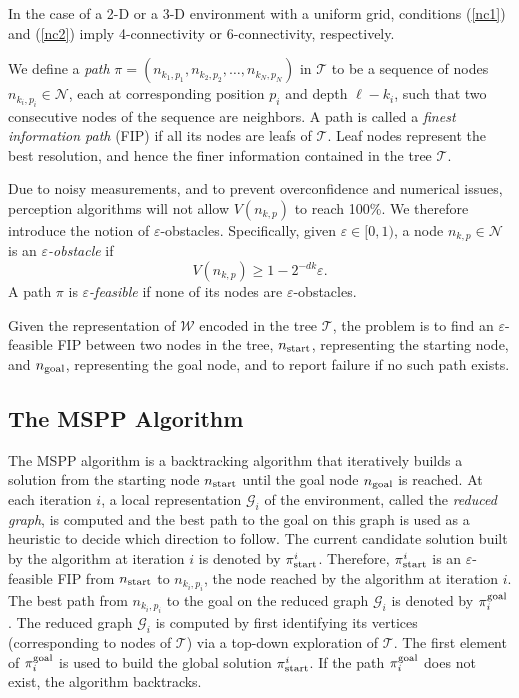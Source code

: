 \documentclass[letterpaper, 10 pt, conference]{ieeeconf}
\theoremstyle{definition}
\begin{document}
In the case of a 2-D or a 3-D environment with a uniform grid, conditions (\ref{nc1}) and (\ref{nc2}) imply 4-connectivity or 6-connectivity, respectively.

We define a \textit{path} $\pi=(n_{k_1,p_1},n_{k_2,p_2},\dots,n_{k_N,p_N})$ in $\mathcal{T}$ to be a sequence of nodes $n_{k_i,p_i} \in \mathcal{N}$, each at corresponding  position $p_i$ and depth $\ell-k_i$, such that two consecutive nodes of the sequence are neighbors.
A path is called a \textit{finest information path} (FIP) if all its nodes are leafs of $\mathcal{T}$.
Leaf nodes represent the best resolution, and hence the finer information contained in the tree $\mathcal{T}$.

Due to noisy measurements, and to prevent overconfidence and numerical issues, perception algorithms will not allow $V(n_{k,p})$ to reach 100\%. We therefore introduce the notion of $\varepsilon$-obstacles.
Specifically, given $\varepsilon \in [0,1) $, a node $n_{k,p}\in \mathcal{N}$ is an \textit{$\varepsilon$-obstacle} if
\begin{equation}
\label{obstacle_def}
V(n_{k,p})\geq 1-2^{-d k}\varepsilon.
\end{equation}
A path $\pi$ is \textit{$\varepsilon$-feasible} if none of its nodes are $\varepsilon$-obstacles.

Given the representation of $\mathcal{W}$ encoded in the tree $\mathcal{T}$,
the problem is to find an $\varepsilon$-feasible FIP between two nodes in the tree, $n_{\rm{start}}$, representing the starting node, and $n_{\rm{goal}}$, representing the goal node, and to report failure if no such path exists.

\subsection{The MSPP Algorithm}

The MSPP algorithm is a backtracking algorithm that iteratively builds a solution from the starting node $n_{\rm{start}}$ until the goal node $n_{\rm{goal}}$ is reached.
At each iteration $i$, a local representation $\mathcal{G}_i$ of the environment, called the \textit{reduced graph}, is computed and the best path to the goal on this graph is used as a heuristic to decide which direction to follow.
The current candidate solution built by the algorithm at iteration $i$ is denoted by $\pi_{\rm{start}}^i$.
Therefore, $\pi_{\rm{start}}^i$ is an $\varepsilon$-feasible FIP from $n_{\rm{start}}$ to $n_{k_i,p_i}$, the node reached by the algorithm at iteration $i$.
The best path from $n_{k_i,p_i}$ to the goal on the reduced graph $\mathcal{G}_i$ is denoted by $\pi_i^{\rm{goal}}$.
The reduced graph
$\mathcal{G}_i$ is computed by first identifying its vertices (corresponding to nodes of $\mathcal{T}$) via a top-down exploration of $\mathcal{T}$.
The first element of $\pi^{\rm{goal}}_i$ is used to build the global solution $\pi_{\rm{start}}^i$. If the path $\pi^{\rm{goal}}_i$ does not exist, the algorithm backtracks.
\end{document}
